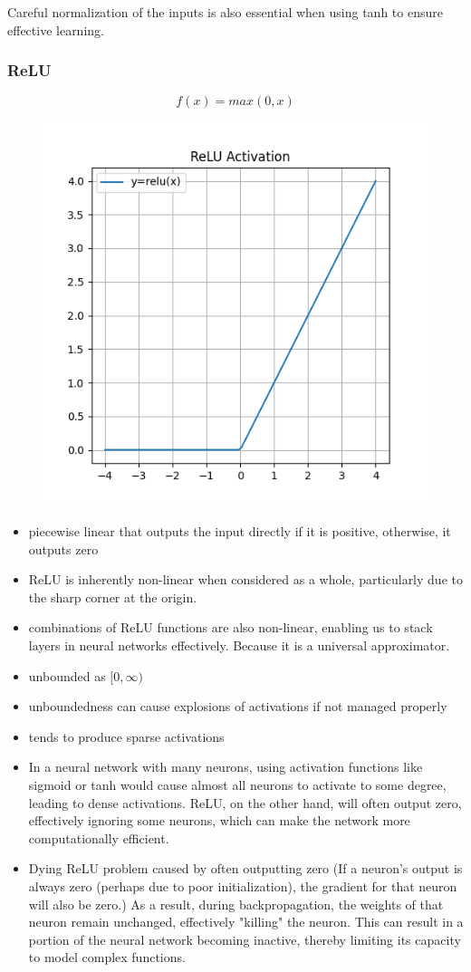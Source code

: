 \documentclass[11pt]{article}
\begin{document}
Careful normalization of the inputs is also essential when using tanh to ensure effective learning.

\subsubsection{ReLU}

\begin{definition}\label{eq:activation-relu}
    \begin{equation*}
        f(x) = max(0,x)
    \end{equation*}
\end{definition}

\begin{figure}[H]
    \centering
    \includegraphics*[width=.4\linewidth]{figures/ReLu Activation.png}\label{fig:relu}
\end{figure}

\begin{itemize}
    \item piecewise linear that outputs the input directly if it is positive, otherwise, it outputs zero
    \item ReLU is inherently non-linear when considered as a whole, particularly due to the sharp corner at the origin.
    \item combinations of ReLU functions are also non-linear, enabling us to stack layers in neural networks effectively. Because it is a universal approximator.
    \item unbounded as $[0,\infty)$
    \item unboundedness can cause explosions of activations if not managed properly
    \item tends to produce sparse activations
    \item In a neural network with many neurons, using activation functions like sigmoid or tanh would cause almost all neurons to activate to some degree, leading to dense activations. ReLU, on the other hand, will often output zero, effectively ignoring some neurons, which can make the network more computationally efficient.
    \item Dying ReLU problem caused by often outputting zero (If a neuron's output is always zero (perhaps due to poor initialization), the gradient for that neuron will also be zero.) As a result, during backpropagation, the weights of that neuron remain unchanged, effectively "killing" the neuron. This can result in a portion of the neural network becoming inactive, thereby limiting its capacity to model complex functions.
\end{itemize}
\end{document}
